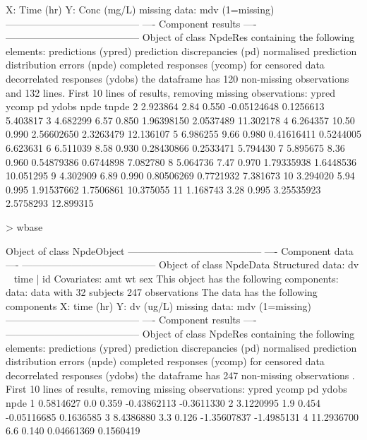 \documentclass{report}
\begin{document}
\begin{mdframed}[backgroundcolor=green!13]
\begin{Schunk}
\begin{Soutput}
     X: Time (hr) 
     Y: Conc (mg/L) 
     missing data: mdv  (1=missing)
-----------------------------------------
----        Component results        ----
-----------------------------------------
Object of class NpdeRes
  containing the following elements:
    predictions (ypred)
    prediction discrepancies (pd)
    normalised prediction distribution errors (npde)
    completed responses (ycomp) for censored data
    decorrelated responses (ydobs)
  the dataframe has  120 non-missing observations and 132 lines.
First 10 lines of results, removing missing observations:
      ypred ycomp    pd       ydobs      npde     tnpde
2  2.923864  2.84 0.550 -0.05124648 0.1256613  5.403817
3  4.682299  6.57 0.850  1.96398150 2.0537489 11.302178
4  6.264357 10.50 0.990  2.56602650 2.3263479 12.136107
5  6.986255  9.66 0.980  0.41616411 0.5244005  6.623631
6  6.511039  8.58 0.930  0.28430866 0.2533471  5.794430
7  5.895675  8.36 0.960  0.54879386 0.6744898  7.082780
8  5.064736  7.47 0.970  1.79335938 1.6448536 10.051295
9  4.302909  6.89 0.990  0.80506269 0.7721932  7.381673
10 3.294020  5.94 0.995  1.91537662 1.7506861 10.375055
11 1.168743  3.28 0.995  3.25535923 2.5758293 12.899315
\end{Soutput}
\begin{Sinput}
> wbase
\end{Sinput}
\begin{Soutput}
Object of class NpdeObject
-----------------------------------------
----        Component data           ----
-----------------------------------------
Object of class NpdeData
    Structured data: dv ~ time | id 
    Covariates: amt wt sex 
This object has the following components:
     data: data
     with 32 subjects
      247 observations
The data has the following components
     X: time (hr) 
     Y: dv (ug/L) 
     missing data: mdv  (1=missing)
-----------------------------------------
----        Component results        ----
-----------------------------------------
Object of class NpdeRes
  containing the following elements:
    predictions (ypred)
    prediction discrepancies (pd)
    normalised prediction distribution errors (npde)
    completed responses (ycomp) for censored data
    decorrelated responses (ydobs)
  the dataframe has  247 non-missing observations .
First 10 lines of results, removing missing observations:
        ypred ycomp    pd       ydobs       npde
1   0.5814627   0.0 0.359 -0.43862113 -0.3611330
2   3.1220995   1.9 0.454 -0.05116685  0.1636585
3   8.4386880   3.3 0.126 -1.35607837 -1.4985131
4  11.2936700   6.6 0.140  0.04661369  0.1560419

\end{Soutput}
\end{Schunk}
\end{mdframed}
\end{document}
